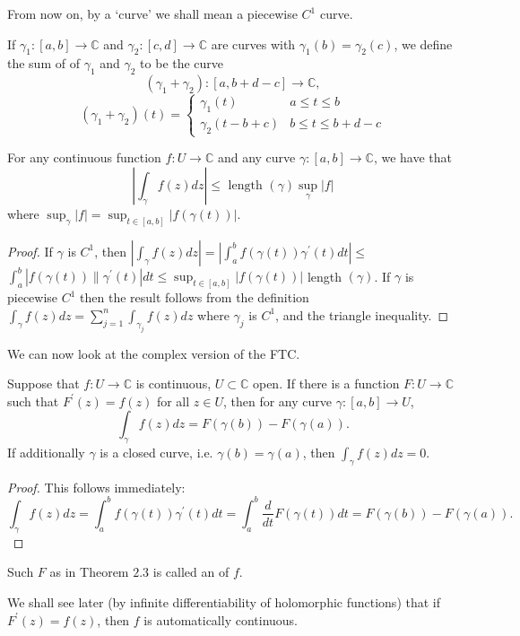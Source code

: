 \documentclass[a4paper]{scrartcl}
\begin{document}
\begin{remark}
      From now on, by a `curve' we shall mean a piecewise $C^{1}$ curve.
\end{remark}
\begin{definition*}
     If $\gamma_{1}:[a, b] \rightarrow \mathbb{C}$ and $\gamma_{2}:[c, d] \rightarrow \mathbb{C}$ are curves with $\gamma_{1}(b)=\gamma_{2}(c)$, we define the sum of of $\gamma_{1}$ and $\gamma_{2}$ to be the curve \[
          \left(\gamma_{1}+\gamma_{2}\right): [a, b+d-c] \rightarrow \mathbb{C}
     ,\] 
     \begin{equation*}
          \left(\gamma_{1}+\gamma_{2}\right)(t)=
           \begin{cases}
               \gamma_{1}(t) & a \leq t \leq b \\
               \gamma_{2}(t-b+c) & b \leq t \leq b+d-c
          \end{cases}
     \end{equation*}
\end{definition*}
\begin{proposition}
     For any continuous function $f: U \rightarrow \mathbb{C}$ and any curve $\gamma:[a, b] \rightarrow \mathbb{C}$, we have that
     $$
     \left|\int_{\gamma} f(z) d z\right| \leq \text { length }(\gamma) \sup _{\gamma}|f|
     $$
     where $\sup _{\gamma}|f|=\sup _{t \in[a, b]}|f(\gamma(t))|$.
\end{proposition}
\begin{proof}
     If $\gamma$ is $C^{1}$, then $\left|\int_{\gamma} f(z) d z\right|=\left|\int_{a}^{b} f(\gamma(t)) \gamma^{\prime}(t) d t\right| \leq$
     $\int_{a}^{b}\left|f(\gamma(t)) \| \gamma^{\prime}(t)\right| d t \leq \sup _{t \in[a, b]}|f(\gamma(t))|$ length $(\gamma)$. If $\gamma$ is piecewise $C^{1}$ then the result follows from the definition $\int_{\gamma} f(z) d z=\sum_{j=1}^{n} \int_{\gamma_{j}} f(z) d z$ where $\gamma_{j}$ is $C^{1}$, and the triangle inequality.
\end{proof}
We can now look at the complex version of the FTC.
\begin{theorem}
     Suppose that $f: U \rightarrow \mathbb{C}$ is continuous, $U \subset \mathbb{C}$ open. If there is a function $F: U \rightarrow \mathbb{C}$ such that $F^{\prime}(z)=f(z)$ for all $z \in U$, then for any curve $\gamma:[a, b] \rightarrow U$,
     $$
     \int_{\gamma} f(z) d z=F(\gamma(b))-F(\gamma(a)) .
     $$
     If additionally $\gamma$ is a closed curve, i.e. $\gamma(b)=\gamma(a)$, then $\int_{\gamma} f(z) d z=0$.
\end{theorem}
\begin{proof}
     This follows immediately:
      \[
          \int_{\gamma} f(z) d z=\int_{a}^{b} f(\gamma(t)) \gamma^{\prime}(t) d t=\int_{a}^{b} \frac{d}{d t} F(\gamma(t)) d t=F(\gamma(b))-F(\gamma(a))
      .\] 
\end{proof}
\begin{remark}
     Such $F$ as in Theorem $2.3$ is called an  of $f$.
     
     We shall see later (by infinite differentiability of holomorphic functions) that if $F^{\prime}(z)=f(z)$, then $f$ is automatically continuous.
\end{remark}
\end{document}
